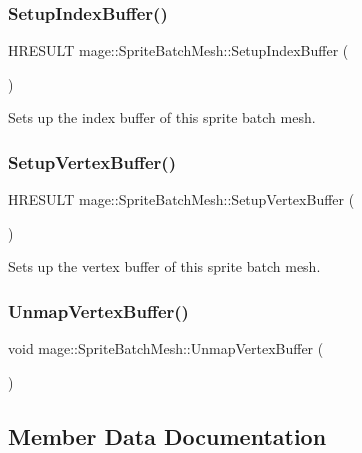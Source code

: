 \subsubsection{\texorpdfstring{Setup\+Index\+Buffer()}{SetupIndexBuffer()}}
{\footnotesize\ttfamily H\+R\+E\+S\+U\+LT mage\+::\+Sprite\+Batch\+Mesh\+::\+Setup\+Index\+Buffer (\begin{DoxyParamCaption}{ }\end{DoxyParamCaption})\hspace{0.3cm}{\ttfamily [private]}}

Sets up the index buffer of this sprite batch mesh. \hypertarget{classmage_1_1_sprite_batch_mesh_a63088254a3c57d61c3992f308c62b138}{}\label{classmage_1_1_sprite_batch_mesh_a63088254a3c57d61c3992f308c62b138} 
\subsubsection{\texorpdfstring{Setup\+Vertex\+Buffer()}{SetupVertexBuffer()}}
{\footnotesize\ttfamily H\+R\+E\+S\+U\+LT mage\+::\+Sprite\+Batch\+Mesh\+::\+Setup\+Vertex\+Buffer (\begin{DoxyParamCaption}{ }\end{DoxyParamCaption})\hspace{0.3cm}{\ttfamily [private]}}

Sets up the vertex buffer of this sprite batch mesh. \hypertarget{classmage_1_1_sprite_batch_mesh_a48ed983397a37a5874101b49c040b78c}{}\label{classmage_1_1_sprite_batch_mesh_a48ed983397a37a5874101b49c040b78c} 
\subsubsection{\texorpdfstring{Unmap\+Vertex\+Buffer()}{UnmapVertexBuffer()}}
{\footnotesize\ttfamily void mage\+::\+Sprite\+Batch\+Mesh\+::\+Unmap\+Vertex\+Buffer (\begin{DoxyParamCaption}{ }\end{DoxyParamCaption})}



\subsection{Member Data Documentation}
\hypertarget{classmage_1_1_sprite_batch_mesh_aeac9ce4a3a16f212a5bb29f89038110b}{}\label{classmage_1_1_sprite_batch_mesh_aeac9ce4a3a16f212a5bb29f89038110b} 
